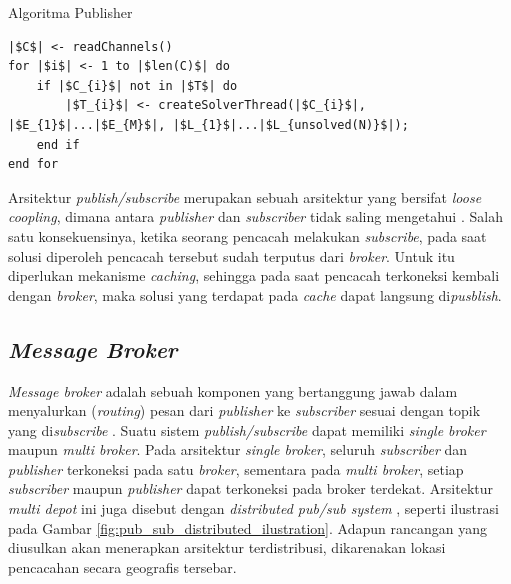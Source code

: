 \begin{listing}
	\caption{Algoritma Publisher}
	\label{lst:proposed_publisher_algorithm}
	\begin{verbatim}
|$C$| <- readChannels()
for |$i$| <- 1 to |$len(C)$| do
	if |$C_{i}$| not in |$T$| do
		|$T_{i}$| <- createSolverThread(|$C_{i}$|, |$E_{1}$|...|$E_{M}$|, |$L_{1}$|...|$L_{unsolved(N)}$|);
	end if
end for
	\end{verbatim}
\end{listing}


Arsitektur \textit{publish/subscribe} merupakan sebuah arsitektur yang bersifat \textit{loose coopling}, dimana antara \textit{publisher} dan \textit{subscriber} tidak saling mengetahui \citep{muhl_large-scale_2002}. Salah satu konsekuensinya, ketika seorang pencacah melakukan \textit{subscribe}, pada saat solusi diperoleh pencacah tersebut sudah terputus dari \textit{broker}. Untuk itu diperlukan mekanisme \textit{caching}, sehingga pada saat pencacah terkoneksi kembali dengan \textit{broker}, maka solusi yang terdapat pada \textit{cache} dapat langsung di\textit{pusblish}.


\subsection{\textit{Message Broker}}
\textit{Message broker} adalah sebuah komponen yang bertanggung jawab dalam menyalurkan (\textit{routing}) pesan dari \textit{publisher} ke \textit{subscriber} sesuai dengan topik yang di\textit{subscribe} \citep{banavar_efficient_1999}. Suatu sistem \textit{publish/subscribe} dapat memiliki \textit{single broker} maupun \textit{multi broker}. Pada arsitektur \textit{single broker}, seluruh \textit{subscriber} dan \textit{publisher} terkoneksi pada satu \textit{broker}, sementara pada \textit{multi broker}, setiap \textit{subscriber} maupun \textit{publisher} dapat terkoneksi pada broker terdekat. Arsitektur \textit{multi depot} ini juga disebut dengan \textit{distributed pub/sub system} \citep{muhl_large-scale_2002}, seperti ilustrasi pada Gambar \ref{fig:pub_sub_distributed_ilustration}. Adapun rancangan yang diusulkan akan menerapkan arsitektur terdistribusi, dikarenakan lokasi pencacahan secara geografis tersebar.


